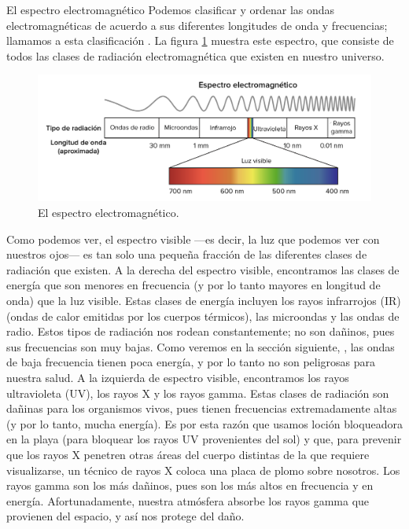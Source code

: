 \begin{sectionbox}{El espectro electromagnético}
    Podemos clasificar y ordenar las ondas electromagnéticas de acuerdo a sus diferentes longitudes de onda y frecuencias; llamamos a esta clasificación . La figura \ref{fig:01f944ab4471010d09766560f4d1c6da4846d97d} muestra este espectro, que consiste de todos las clases de radiación electromagnética que existen en nuestro universo.

    \begin{figure}[H]
        \centering
        \includegraphics[width=0.9\linewidth]{../images/01f944ab4471010d09766560f4d1c6da4846d97d}
        \caption{El espectro electromagnético.}
        \label{fig:01f944ab4471010d09766560f4d1c6da4846d97d}
    \end{figure}

    Como podemos ver, el espectro visible —es decir, la luz que podemos ver con nuestros ojos— es tan solo una pequeña fracción de las diferentes clases de radiación que existen. A la derecha del espectro visible, encontramos las clases de energía que son menores en frecuencia (y por lo tanto mayores en longitud de onda) que la luz visible. Estas clases de energía incluyen los rayos infrarrojos (IR) (ondas de calor emitidas por los cuerpos térmicos), las microondas y las ondas de radio. Estos tipos de radiación nos rodean constantemente; no son dañinos, pues sus frecuencias son muy bajas. Como veremos en la sección siguiente, , las ondas de baja frecuencia tienen poca energía, y por lo tanto no son peligrosas para nuestra salud.
    A la izquierda de espectro visible, encontramos los rayos ultravioleta (UV), los rayos X y los rayos gamma. Estas clases de radiación son dañinas para los organismos vivos, pues tienen frecuencias extremadamente altas (y por lo tanto, mucha energía). Es por esta razón que usamos loción bloqueadora en la playa (para bloquear los rayos UV provenientes del sol) y que, para prevenir que los rayos X penetren otras áreas del cuerpo distintas de la que requiere visualizarse, un técnico de rayos X coloca una placa de plomo sobre nosotros. Los rayos gamma son los más dañinos, pues son los más altos en frecuencia y en energía. Afortunadamente, nuestra atmósfera absorbe los rayos gamma que provienen del espacio, y así nos protege del daño.
\end{sectionbox}